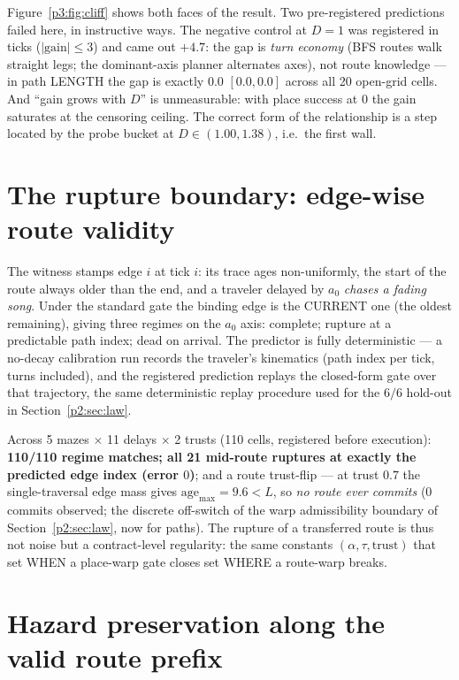 \documentclass{article}
\begin{document}
Figure~\ref{p3:fig:cliff} shows both faces of the result.
Two pre-registered predictions failed here, in instructive ways.
The negative control at $D{=}1$ was registered in ticks
($|\text{gain}|\le 3$) and came out $+4.7$: the gap is \emph{turn
economy} (BFS routes walk straight legs; the dominant-axis planner
alternates axes), not route knowledge --- in path LENGTH the gap is
exactly $0.0$ $[0.0,0.0]$ across all 20 open-grid cells. And ``gain
grows with $D$'' is unmeasurable: with place success at $0$ the gain
saturates at the censoring ceiling. The correct form of the relationship is a
step located by the probe bucket at $D\in(1.00,1.38)$, i.e.\ the
first wall.


\section{The rupture boundary: edge-wise route validity}
\label{p3:sec:rupture}

The witness stamps edge $i$ at tick $i$: its trace ages
non-uniformly, the start of the route always older than the end, and
a traveler delayed by $a_0$ \emph{chases a fading song}. Under the
standard gate the binding edge is the CURRENT one (the oldest
remaining), giving three regimes on the $a_0$ axis: complete;
rupture at a predictable path index; dead on arrival. The predictor
is fully deterministic --- a no-decay calibration run records the
traveler's kinematics (path index per tick, turns included), and the
registered prediction replays the closed-form gate over that
trajectory, the same deterministic replay procedure used for the
$6/6$ hold-out in Section~\ref{p2:sec:law}.

Across 5 mazes $\times$ 11 delays $\times$ 2 trusts (110 cells,
registered before execution): \textbf{110/110 regime matches; all 21
mid-route ruptures at exactly the predicted edge index (error $0$)};
and a route trust-flip --- at trust $0.7$ the single-traversal edge
mass gives $\mathrm{age}_{\max} = 9.6 < L$, so \emph{no route ever
commits} (0 commits observed; the discrete off-switch of the
warp admissibility boundary of Section~\ref{p2:sec:law}, now for paths). The rupture of a transferred route is
thus not noise but a contract-level regularity: the same constants
$(\alpha,\tau,\text{trust})$ that set WHEN a place-warp gate closes
set WHERE a route-warp breaks.


\section{Hazard preservation along the valid route prefix}
\label{p3:sec:hazard}
\end{document}
